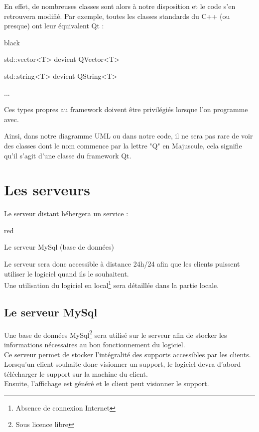 {En effet, de nombreuses classes sont alors à notre disposition et le code s'en retrouvera modifié. Par exemple, toutes les classes standards du C++ (ou presque) ont leur équivalent Qt : 
\begin{items}{black}{\Circle}
    \item std::vector<T> devient QVector<T>
    \item std::string<T> devient QString<T>
    \item ...
\end{items} 

Ces types propres au framework doivent être privilégiés lorsque l'on programme avec.

Ainsi, dans notre diagramme UML ou dans notre code, il ne sera pas rare de voir des classes dont le nom commence par la lettre "Q" en Majuscule, cela signifie qu'il s'agit d'une classe du framework Qt.

\section{Les serveurs}

Le serveur distant hébergera un service : 
  \begin{items}{red}{\Circle}
    \item Le serveur MySql (base de données)
 \end{items}

Le serveur sera donc accessible à distance 24h/24 afin que les clients puissent utiliser le logiciel quand ils le souhaitent.\\
Une utilisation du logiciel en local\footnote{Absence de connexion Internet} sera détaillée dans la partie locale.

\subsection{Le serveur MySql}

Une base de données MySql\footnote{Sous licence libre} sera utilisé sur le serveur afin de stocker les informations nécessaires au bon fonctionnement du logiciel.\\

Ce serveur permet de stocker l'intégralité des supports accessibles par les clients.\\
Lorsqu'un client souhaite donc visionner un support, le logiciel devra d'abord télécharger le support sur la machine du client. \\
Ensuite, l'affichage est généré et le client peut visionner le support.


}
